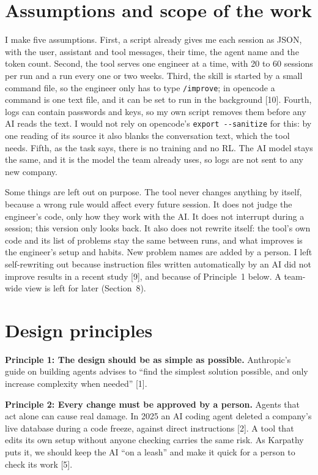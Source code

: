 \documentclass[10pt,twocolumn]{article}
\begin{document}
\section{Assumptions and scope of the work}
I make five assumptions. First, a script already gives me each session as JSON, with the user, assistant and tool messages, their time, the agent name and the token count. Second, the tool serves one engineer at a time, with 20 to 60 sessions per run and a run every one or two weeks. Third, the skill is started by a small command file, so the engineer only has to type \texttt{/improve}; in opencode a command is one text file, and it can be set to run in the background [10]. Fourth, logs can contain passwords and keys, so my own script removes them before any AI reads the text. I would not rely on opencode's \texttt{export -{}-sanitize} for this: by one reading of its source it also blanks the conversation text, which the tool needs. Fifth, as the task says, there is no training and no RL. The AI model stays the same, and it is the model the team already uses, so logs are not sent to any new company.

Some things are left out on purpose. The tool never changes anything by itself, because a wrong rule would affect every future session. It does not judge the engineer's code, only how they work with the AI. It does not interrupt during a session; this version only looks back. It also does not rewrite itself: the tool's own code and its list of problems stay the same between runs, and what improves is the engineer's setup and habits. New problem names are added by a person. I left self-rewriting out because instruction files written automatically by an AI did not improve results in a recent study [9], and because of Principle~1 below. A team-wide view is left for later (Section~8).

\section{Design principles}
\textbf{Principle 1: The design should be as simple as possible.} Anthropic's guide on building agents advises to ``find the simplest solution possible, and only increase complexity when needed'' [1].

\textbf{Principle 2: Every change must be approved by a person.} Agents that act alone can cause real damage. In 2025 an AI coding agent deleted a company's live database during a code freeze, against direct instructions [2]. A tool that edits its own setup without anyone checking carries the same risk. As Karpathy puts it, we should keep the AI ``on a leash'' and make it quick for a person to check its work [5].
\end{document}
